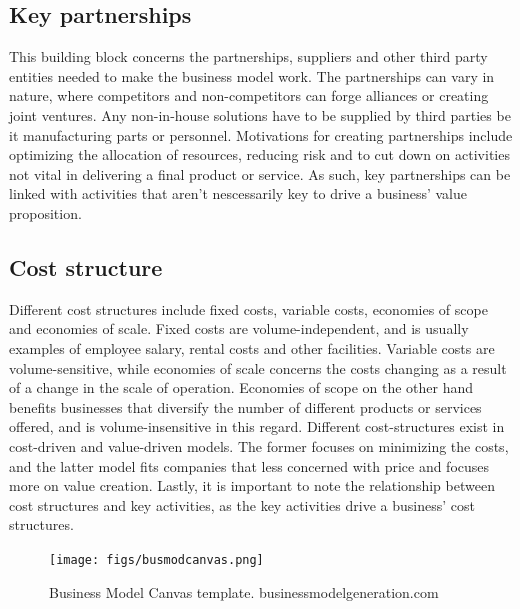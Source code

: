 \subsection{Key partnerships}
This building block concerns the partnerships, suppliers and other third party entities needed to make the business model work. The partnerships can vary in nature, where competitors and non-competitors can forge alliances or creating joint ventures. Any non-in-house solutions have to be supplied by third parties be it manufacturing parts or personnel. Motivations for creating partnerships include optimizing the allocation of resources, reducing risk and to cut down on activities not vital in delivering a final product or service. As such, key partnerships can be linked with activities that aren't nescessarily key to drive a business' value proposition. 

\subsection{Cost structure}
Different cost structures include fixed costs, variable costs, economies of scope and economies of scale. Fixed costs are volume-independent, and is usually examples of employee salary, rental costs and other facilities. Variable costs are volume-sensitive, while economies of scale concerns the costs changing as a result of a change in the scale of operation. Economies of scope on the other hand benefits businesses that diversify the number of different products or services offered, and is volume-insensitive in this regard. Different cost-structures exist in cost-driven and value-driven models. The former focuses on minimizing the costs, and the latter model fits companies that less concerned with price and focuses more on value creation.
Lastly, it is important to note the relationship between cost structures and key activities, as the key activities drive a business' cost structures. 

\begin{figure}[]
\centering
\texttt{[image: figs/busmodcanvas.png]}
\caption{Business Model Canvas template. \textcopyright businessmodelgeneration.com}
\label{fig:businessmodelcanvas}
\end{figure}
